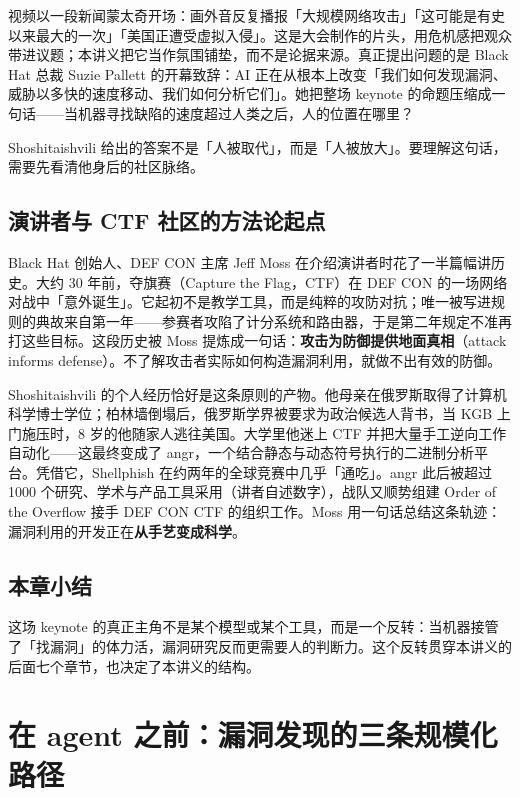 \documentclass[a4paper,11pt]{article}
\begin{document}
视频以一段新闻蒙太奇开场：画外音反复播报「大规模网络攻击」「这可能是有史以来最大的一次」「美国正遭受虚拟入侵」。这是大会制作的片头，用危机感把观众带进议题；本讲义把它当作氛围铺垫，而不是论据来源。真正提出问题的是 Black Hat 总裁 Suzie Pallett 的开幕致辞：AI 正在从根本上改变「我们如何发现漏洞、威胁以多快的速度移动、我们如何分析它们」。她把整场 keynote 的命题压缩成一句话——当机器寻找缺陷的速度超过人类之后，人的位置在哪里？

Shoshitaishvili 给出的答案不是「人被取代」，而是「人被放大」。要理解这句话，需要先看清他身后的社区脉络。

\subsection{演讲者与 CTF 社区的方法论起点}

Black Hat 创始人、DEF CON 主席 Jeff Moss 在介绍演讲者时花了一半篇幅讲历史。大约 30 年前，夺旗赛（Capture the Flag，CTF）在 DEF CON 的一场网络对战中「意外诞生」。它起初不是教学工具，而是纯粹的攻防对抗；唯一被写进规则的典故来自第一年——参赛者攻陷了计分系统和路由器，于是第二年规定不准再打这些目标。这段历史被 Moss 提炼成一句话：\textbf{攻击为防御提供地面真相}（attack informs defense）。不了解攻击者实际如何构造漏洞利用，就做不出有效的防御。

Shoshitaishvili 的个人经历恰好是这条原则的产物。他母亲在俄罗斯取得了计算机科学博士学位；柏林墙倒塌后，俄罗斯学界被要求为政治候选人背书，当 KGB 上门施压时，8 岁的他随家人逃往美国。大学里他迷上 CTF 并把大量手工逆向工作自动化——这最终变成了 angr，一个结合静态与动态符号执行的二进制分析平台。凭借它，Shellphish 在约两年的全球竞赛中几乎「通吃」。angr 此后被超过 1000 个研究、学术与产品工具采用（讲者自述数字），战队又顺势组建 Order of the Overflow 接手 DEF CON CTF 的组织工作。Moss 用一句话总结这条轨迹：漏洞利用的开发正在\textbf{从手艺变成科学}。

\subsection{本章小结}

这场 keynote 的真正主角不是某个模型或某个工具，而是一个反转：当机器接管了「找漏洞」的体力活，漏洞研究反而更需要人的判断力。这个反转贯穿本讲义的后面七个章节，也决定了本讲义的结构。

\section{在 agent 之前：漏洞发现的三条规模化路径}
\end{document}
